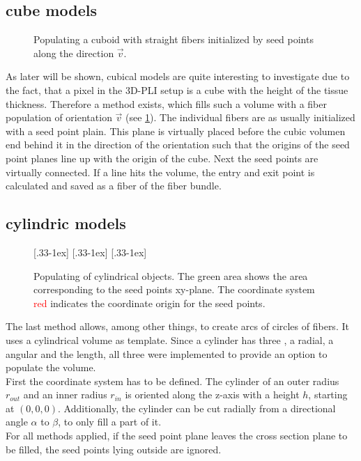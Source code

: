\subsection{cube models} \label{sec:cubeModelBuilding}
% 
\begin{figure}[!t]
    \centering
    \setlength{\tikzwidth}{0.5\textwidth}
	\caption{Populating a cuboid with straight fibers initialized by seed points along the direction $\vec{v}$.}
    \label{fig:cubeBuild}%
\end{figure}
% 
As later will be shown, cubical models are quite interesting to investigate due to the fact, that a pixel in the \ac{3D-PLI} setup is a cube with the height of the tissue thickness.
Therefore a method exists, which fills such a volume with a fiber population of orientation $\vec{v}$ (see \cref{fig:cubeBuild}).
The individual fibers are as usually initialized with a seed point plain.
This plane is virtually placed before the cubic volumen end behind it in the direction of the orientation such that the origins of the seed point planes line up with the origin of the cube.
Next the seed points are virtually connected.
If a line hits the volume, the entry and exit point is calculated and saved as a fiber of the fiber bundle.
% 
% 
% 
\subsection{cylindric models}
% 
\begin{figure}[!t]
    \centering
    \setlength{\tikzwidth}{0.31\textwidth}
    [.33\textwidth-1ex]{
    }\hfill
    [.33\textwidth-1ex]{
    }\hfill
    [.33\textwidth-1ex]{
    }
	\caption{Populating of cylindrical objects. The green area shows the area corresponding to the seed points xy-plane. The coordinate system \textcolor{RED}{red} indicates the coordinate origin for the seed points.}
\end{figure}
% 
The last method allows, among other things, to create arcs of circles of fibers.
It uses a cylindrical volume as template.
% 
Since a cylinder has three , a radial, a angular and the length, all three were implemented to provide an option to populate the volume.
\\
% 
First the coordinate system has to be defined.
The cylinder of an outer radius $r_{\mathit{out}}$ and an inner radius $r_{\mathit{in}}$ is oriented along the z-axis with a height $h$, starting at $(0,0,0)$.
Additionally, the cylinder can be cut radially from a directional angle $\alpha$ to $\beta$, to only fill a part of it.
\\
% 
For all methods applied, if the seed point plane leaves the cross section plane to be filled, the seed points lying outside are ignored.
% 
